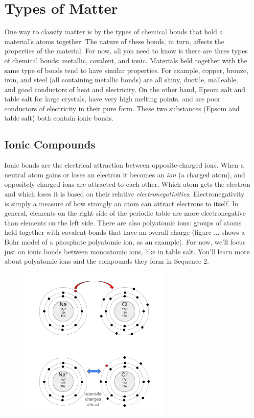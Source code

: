 \section{Types of Matter}
One way to classify matter is by the types of chemical bonds that hold a 
material's atoms together. The nature of these bonds, in turn, affects the 
properties of the material. For now, all you need to know is there are three types
of chemical bonds: metallic, covalent, and ionic. Materials held together with the
same type of bonds tend to have similar properties. For example, copper, bronze, 
iron, and steel (all containing metallic bonds) are all shiny, ductile, malleable,
and good conductors of heat and electricity. On the other hand, Epsom salt and 
table salt for large crystals, have very high melting points, and are poor 
conductors of electricity in their pure form. These two substances (Epsom and 
table salt) both contain ionic bonds. 

\subsection{Ionic Compounds}
Ionic bonds are the electrical attraction between opposite-charged ions. When a 
neutral atom gains or loses an electron it becomes an \textit{ion} (a charged 
atom), and oppositely-charged ions are attracted to each other. Which atom gets 
the electron and which loses it is based on their relative 
\textit{electronegativities}. Electronegativity is simply
a measure of how strongly an atom can attract electrons to itself. In general, 
elements on the right side of the periodic table are more electronegative than 
elements on the left side. There are also polyatomic ions: groups of atoms held 
together with covalent bonds that have an overall charge (figure ... shows a Bohr 
model of a phosphate polyatomic ion, as an example). For now, we'll focus just on 
ionic bonds between monoatomic ions, like in table salt. You'll learn more about 
polyatomic ions and the compounds they form in Sequence 2. 

\begin{figure}
\noindent\includegraphics[width=3in]{NaCl_xfer.png}
\caption{}
\label{fig:NaCl_xfer}
\end{figure}

